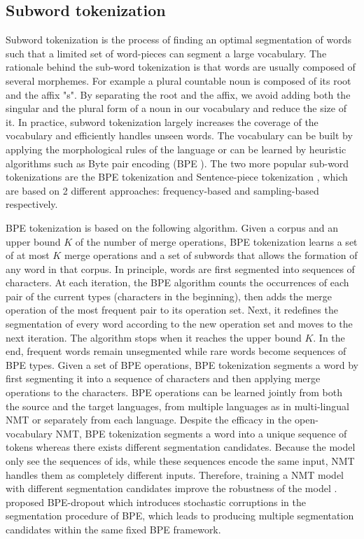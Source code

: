 \subsection{Subword tokenization}
Subword tokenization is the process of finding an optimal segmentation of words such that a limited set of word-pieces can segment a large vocabulary. The rationale behind the sub-word tokenization is that words are usually composed of several morphemes. For example a plural countable noun is composed of its root and the affix "s". By separating the root and the affix, we avoid adding both the singular and the plural form of a noun in our vocabulary and reduce the size of it. In practice, subword tokenization largely increases the coverage of the vocabulary and efficiently handles unseen words. The vocabulary can be built by applying the morphological rules of the language or can be learned by heuristic algorithms such
as Byte pair encoding (BPE )\citep{Gage94anew,Sennrich16neural}. The two more popular sub-word tokenizations are the BPE tokenization \citep{Gage94anew,Sennrich16neural} and Sentence-piece tokenization \citep{Taku18subword}, which are based on 2 different approaches: frequency-based and sampling-based respectively.

BPE tokenization is based on the following algorithm. Given a corpus and an upper bound $K$ of the number of merge operations, BPE tokenization learns a set of at most $K$ merge operations and a set of subwords that allows the formation of any word in that corpus. In principle, words are first segmented into sequences of characters. At each iteration, the BPE algorithm counts the occurrences of each pair of the current types (characters in the beginning), then adds the merge operation of the most frequent pair to its operation set. Next, it redefines the segmentation of every word according to the new operation set and moves to the next iteration. The algorithm stops when it reaches the upper bound $K$. In the end, frequent words remain unsegmented while rare words become sequences of BPE types. Given a set of BPE operations, BPE tokenization segments a word by first segmenting it into a sequence of characters and then applying merge operations to the characters. BPE operations can be learned jointly from both the source and the target languages, from multiple languages as in multi-lingual NMT or separately from each language. Despite the efficacy in the open-vocabulary NMT, BPE tokenization segments a word into a unique sequence of tokens whereas there exists different segmentation candidates. Because the model only see the sequences of ids, while these sequences encode the same input,  NMT handles them as completely different inputs. Therefore, training a NMT model with different segmentation candidates improve the robustness of the model \citep{Taku18subword}. \citet{provilkov20bpe} proposed BPE-dropout which introduces stochastic corruptions in the segmentation procedure of BPE, which leads to producing multiple segmentation candidates within the same fixed BPE framework.

